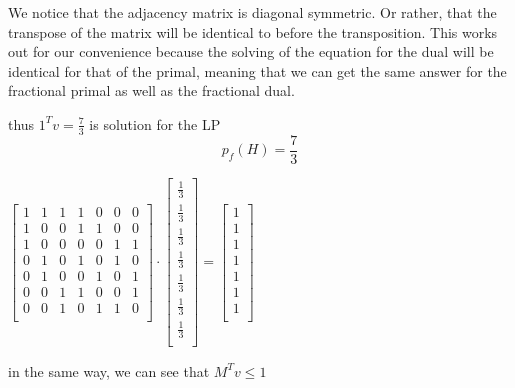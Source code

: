 \documentclass[10pt, AMS Euler]{article}
\begin{document}
We notice that the adjacency matrix is diagonal symmetric. Or rather, that the transpose of the matrix will be identical to before the transposition.  This works out for our convenience because the solving of the equation for the dual will be identical for that of the primal, meaning that we can get the same answer for the fractional primal as well as the fractional dual. 

thus $1^Tv =\frac{7}{3}$ is solution for the LP     \\
$$ p_f(H) = \frac{7}{3} $$



\begin{center}
    $
    \begin{bmatrix}
    1 & 1 & 1 & 1 & 0 & 0 & 0 \\
    1 & 0 & 0 & 1 & 1 & 0 & 0 \\
    1 & 0 & 0 & 0 & 0 & 1 & 1 \\
    0 & 1 & 0 & 1 & 0 & 1 & 0 \\
    0 & 1 & 0 & 0 & 1 & 0 & 1 \\
    0 & 0 & 1 & 1 & 0 & 0 & 1 \\
    0 & 0 & 1 & 0 & 1 & 1 & 0 \\
    \end{bmatrix}
    \cdot
    \begin{bmatrix}
    \frac{1}{3} \\
    \frac{1}{3} \\
    \frac{1}{3} \\
    \frac{1}{3} \\
    \frac{1}{3} \\
    \frac{1}{3} \\
    \frac{1}{3} \\
    \end{bmatrix}
    =
    \begin{bmatrix}
    1 \\
    1 \\
    1 \\
    1 \\
    1 \\
    1 \\
    1 \\
    \end{bmatrix}    
    $
\end{center}

in the same way, we can see that $ M^Tv \leq 1 $
\end{document}
